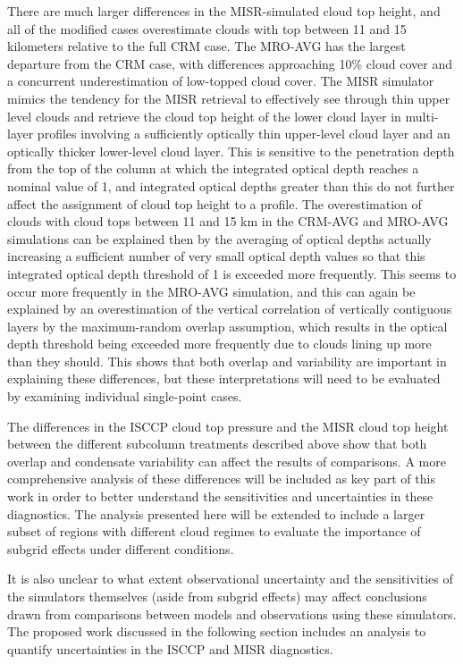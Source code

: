 \documentclass[letter]{article}
\begin{document}
There are much larger differences in the MISR-simulated cloud top height, and all of the modified cases overestimate clouds with top between 11 and 15 kilometers relative to the full CRM case. The MRO-AVG has the largest departure from the CRM case, with differences approaching 10\% cloud cover and a concurrent underestimation of low-topped cloud cover. The MISR simulator mimics the tendency for the MISR retrieval to effectively see through thin upper level clouds and retrieve the cloud top height of the lower cloud layer in multi-layer profiles involving a sufficiently optically thin upper-level cloud layer and an optically thicker lower-level cloud layer. This is sensitive to the penetration depth from the top of the column at which the integrated optical depth reaches a nominal value of 1, and integrated optical depths greater than this do not further affect the assignment of cloud top height to a profile. The overestimation of clouds with cloud tops between 11 and 15 km in the CRM-AVG and MRO-AVG simulations can be explained then by the averaging of optical depths actually increasing a sufficient number of very small optical depth values so that this integrated optical depth threshold of 1 is exceeded more frequently. This seems to occur more frequently in the MRO-AVG simulation, and this can again be explained by an overestimation of the vertical correlation of vertically contiguous layers by the maximum-random overlap assumption, which results in the optical depth threshold being exceeded more frequently due to clouds lining up more than they should. This shows that both overlap and variability are important in explaining these differences, but these interpretations will need to be evaluated by examining individual single-point cases.

The differences in the ISCCP cloud top pressure and the MISR cloud top height between the different subcolumn treatments described above show that both overlap and condensate variability can affect the results of comparisons. A more comprehensive analysis of these differences will be included as key part of this work in order to better understand the sensitivities and uncertainties in these diagnostics. The analysis presented here will be extended to include a larger subset of regions with different cloud regimes to evaluate the importance of subgrid effects under different conditions.

It is also unclear to what extent observational uncertainty and the sensitivities of the simulators themselves (aside from subgrid effects) may affect conclusions drawn from comparisons between models and observations using these simulators. The proposed work discussed in the following section includes an analysis to quantify uncertainties in the ISCCP and MISR diagnostics.
\end{document}
